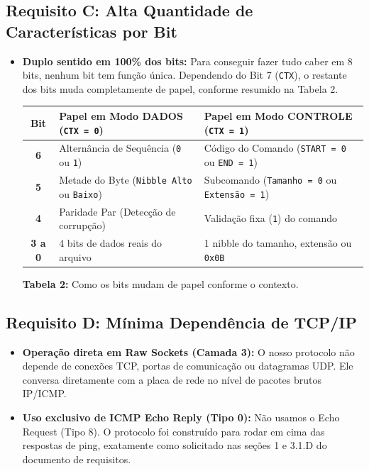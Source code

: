 \documentclass[12pt,a4paper]{article}
\begin{document}
\subsection{Requisito C: Alta Quantidade de Características por Bit}
\begin{itemize}[leftmargin=*]
    \item \textbf{Duplo sentido em 100\% dos bits:} Para conseguir fazer tudo caber em 8 bits, nenhum bit tem função única. Dependendo do Bit 7 (\texttt{CTX}), o restante dos bits muda completamente de papel, conforme resumido na Tabela 2.
    
    \vspace{0.3cm}
    \begin{center}
    \small
    \renewcommand{\arraystretch}{1.3}
    \begin{tabularx}{\textwidth}{c Y Y}
    \toprule
    \textbf{Bit} & \textbf{Papel em Modo DADOS (\texttt{CTX = 0})} & \textbf{Papel em Modo CONTROLE (\texttt{CTX = 1})} \\
    \midrule
    \textbf{6} & Alternância de Sequência (\texttt{0} ou \texttt{1}) & Código do Comando (\texttt{START = 0} ou \texttt{END = 1}) \\
    \textbf{5} & Metade do Byte (\texttt{Nibble Alto} ou \texttt{Baixo}) & Subcomando (\texttt{Tamanho = 0} ou \texttt{Extensão = 1}) \\
    \textbf{4} & Paridade Par (Detecção de corrupção) & Validação fixa (\texttt{1}) do comando \\
    \textbf{3 a 0} & 4 bits de dados reais do arquivo & 1 nibble do tamanho, extensão ou \texttt{0x0B} \\
    \bottomrule
    \end{tabularx}

    \vspace{0.2cm}
    \textbf{Tabela 2:} Como os bits mudam de papel conforme o contexto.
    \end{center}
    \vspace{0.3cm}
\end{itemize}

\subsection{Requisito D: Mínima Dependência de TCP/IP}
\begin{itemize}[leftmargin=*]
    \item \textbf{Operação direta em Raw Sockets (Camada 3):} O nosso protocolo não depende de conexões TCP, portas de comunicação ou datagramas UDP. Ele conversa diretamente com a placa de rede no nível de pacotes brutos IP/ICMP.
    \item \textbf{Uso exclusivo de ICMP Echo Reply (Tipo 0):} Não usamos o Echo Request (Tipo 8). O protocolo foi construído para rodar em cima das respostas de ping, exatamente como solicitado nas seções 1 e 3.1.D do documento de requisitos.
\end{itemize}
\end{document}
